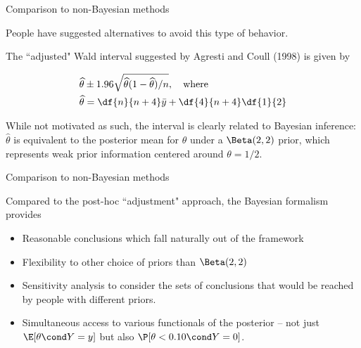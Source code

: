 \documentclass[10pt]{beamer}
\begin{document}
\begin{frame}{Comparison to non-Bayesian methods}

People have suggested alternatives to avoid this type of behavior.  \pause 

The ``adjusted" Wald interval suggested by Agresti and Coull (1998) is given by

\begin{align*}
\widehat{\theta} & \pm 1.96 \sqrt{\widehat{\theta} (1 - \widehat{\theta}) / n},  \quad \text{where} \\
\widehat{\theta}  &= \df{n}{n+4} \bar{y} + \df{4}{n+4} \df{1}{2}
\end{align*}

\pause 
While not motivated as such,  the interval is clearly related to Bayesian inference:  $\widehat{\theta}$ is equivalent to the posterior mean for $\theta$ under a $\Beta(2,2)$ prior,  which represents weak prior information centered around $\theta = 1/2$.

\end{frame}

\begin{frame}{Comparison to non-Bayesian methods}

Compared to the post-hoc ``adjustment" approach,  the Bayesian formalism provides

\begin{itemize}
\item Reasonable conclusions which fall naturally out of the framework
\item Flexibility to other choice of priors than $\Beta(2,2)$
\item Sensitivity analysis to consider the sets of conclusions that would be reached by people with different priors. 
\item Simultaneous access to various functionals of the posterior -- not just $\E[\theta \cond Y= y]$ but also $\P [\theta < 0.10 \cond Y=0]$.
\end{itemize}

\end{frame}
\end{document}
